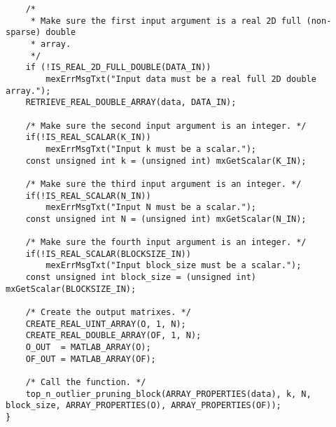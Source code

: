 \begin{lstlisting}
    /*
     * Make sure the first input argument is a real 2D full (non-sparse) double 
     * array.
     */
    if (!IS_REAL_2D_FULL_DOUBLE(DATA_IN))
        mexErrMsgTxt("Input data must be a real full 2D double array.");
	RETRIEVE_REAL_DOUBLE_ARRAY(data, DATA_IN);

    /* Make sure the second input argument is an integer. */
    if(!IS_REAL_SCALAR(K_IN))
        mexErrMsgTxt("Input k must be a scalar.");
    const unsigned int k = (unsigned int) mxGetScalar(K_IN);

    /* Make sure the third input argument is an integer. */
    if(!IS_REAL_SCALAR(N_IN))
        mexErrMsgTxt("Input N must be a scalar.");
    const unsigned int N = (unsigned int) mxGetScalar(N_IN);

    /* Make sure the fourth input argument is an integer. */
    if(!IS_REAL_SCALAR(BLOCKSIZE_IN))
        mexErrMsgTxt("Input block_size must be a scalar.");
    const unsigned int block_size = (unsigned int) mxGetScalar(BLOCKSIZE_IN);

    /* Create the output matrixes. */
    CREATE_REAL_UINT_ARRAY(O, 1, N);
    CREATE_REAL_DOUBLE_ARRAY(OF, 1, N);
    O_OUT  = MATLAB_ARRAY(O);
    OF_OUT = MATLAB_ARRAY(OF);

    /* Call the function. */
    top_n_outlier_pruning_block(ARRAY_PROPERTIES(data), k, N, block_size, ARRAY_PROPERTIES(O), ARRAY_PROPERTIES(OF));
}
\end{lstlisting}
